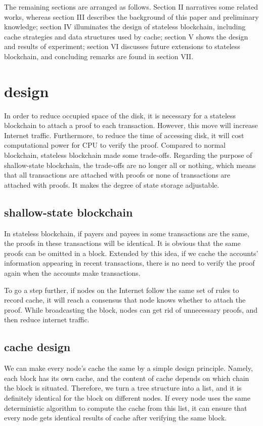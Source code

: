 \documentclass[conference]{IEEEtran}
\begin{document}
The remaining sections are arranged as follows. Section II narratives some related works, whereas section III describes the background of this paper and preliminary knowledge; section IV illuminates the design of stateless blockchain, including cache strategies and data structures used by cache; section V shows the design and results of experiment; section VI discusses future extensions to stateless blockchain, and concluding remarks are found in section VII.

\section{design}
In order to reduce occupied space of the disk, it is necessary for a stateless blockchain to attach a proof to each transaction. However, this move will increase Internet traffic. Furthermore, to reduce the time of accessing disk, it will cost computational power for CPU to verify the proof.
Compared to normal blockchain, stateless blockchain made some trade-offs. Regarding the purpose of shallow-state blockchain, the trade-offs are no longer all or nothing, which means that all transactions are attached with proofs or none of transactions are attached with proofs. It makes the degree of state storage adjustable.

\subsection{shallow-state blockchain}
In stateless blockchain, if payers and payees in some transactions are the same, the proofs in these transactions will be identical. It is obvious that the same proofs can be omitted in a block. Extended by this idea, if we cache the accounts’ information appearing in recent transactions, there is no need to verify the proof again when the accounts make transactions.

To go a step further, if nodes on the Internet follow the same set of rules to record cache, it will reach a consensus that node knows whether to attach the proof. While broadcasting the block, nodes can get rid of unnecessary proofs, and then reduce internet traffic.

\subsection{cache design}
We can make every node's cache the same by a simple design principle. Namely, each block has its own cache, and the content of cache depends on which chain the block is situated. Therefore, we turn a tree structure into a list, and it is definitely identical for the block on different nodes. If every node uses the same deterministic algorithm to compute the cache from this list, it can ensure that every node gets identical results of cache after verifying the same block.
\end{document}
